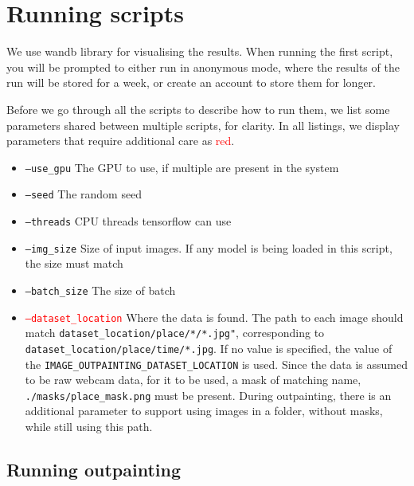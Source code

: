 \section{Running scripts}

We use wandb library for visualising the results. When running the first script, you will be prompted to either run in anonymous mode, where the results of the run will be stored for a week, or create an account to store them for longer. 

Before we go through all the scripts to describe how to run them, we list some parameters shared between multiple scripts, for clarity. In all listings, we display parameters that require additional care as \textcolor{red}{red}.
\begin{itemize}
    \item \texttt{--use\_gpu} The GPU to use, if multiple are present in the system
    \item \texttt{--seed} The random seed
    \item \texttt{--threads} CPU threads tensorflow can use
    \item \texttt{--img\_size} Size of input images. If any model is being loaded in this script, the size must match
    \item \texttt{--batch\_size} The size of batch
    \item \textcolor{red}{\texttt{--dataset\_location}} Where the data is found. The path to each image should match \texttt{dataset\_location/place/*/*.jpg"}, corresponding to \texttt{dataset\_location/place/time/*.jpg}. If no value is specified, the value of the \texttt{IMAGE\_OUTPAINTING\_DATASET\_LOCATION} is used. Since the data is assumed to be raw webcam data, for it to be used, a mask of matching name, \texttt{./masks/place\_mask.png} must be present. During outpainting, there is an additional parameter to support using images in a folder, without masks, while still using this path.
\end{itemize}



\subsection{Running outpainting}

